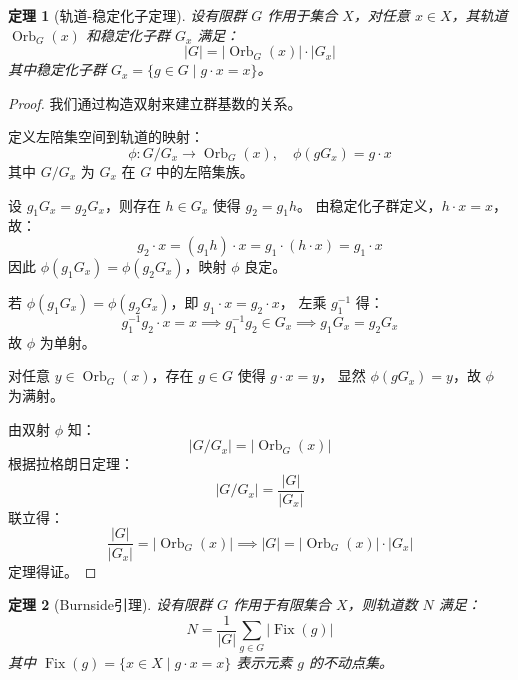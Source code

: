 \documentclass{ctexart}
\newtheorem{theorem}{定理} %
\newtheorem{proof}{证} %
\DeclareMathOperator{\Orb}{Orb} %
\DeclareMathOperator{\Fix}{Fix}
\begin{document}
    \begin{theorem}[轨道-稳定化子定理]
        设有限群 \( G \) 作用于集合 \( X \)，对任意 \( x \in X \)，其轨道 \( \Orb_G(x) \) 和稳定化子群 \( G_x \) 满足：
        \[
        |G| = |\Orb_G(x)| \cdot |G_x|
        \]
        其中稳定化子群 \( G_x = \{ g \in G \mid g \cdot x = x \} \)。
    \end{theorem}

    

\begin{proof}
我们通过构造双射来建立群基数的关系。


定义左陪集空间到轨道的映射：
\[
\phi: G / G_x \to \Orb_G(x), \quad \phi(gG_x) = g \cdot x
\]
其中 \( G / G_x \) 为 \( G_x \) 在 \( G \) 中的左陪集族。


设 \( g_1 G_x = g_2 G_x \)，则存在 \( h \in G_x \) 使得 \( g_2 = g_1 h \)。  
由稳定化子群定义，\( h \cdot x = x \)，故：
\[
g_2 \cdot x = (g_1 h) \cdot x = g_1 \cdot (h \cdot x) = g_1 \cdot x
\]
因此 \( \phi(g_1 G_x) = \phi(g_2 G_x) \)，映射 \( \phi \) 良定。


若 \( \phi(g_1 G_x) = \phi(g_2 G_x) \)，即 \( g_1 \cdot x = g_2 \cdot x \)，  
左乘 \( g_1^{-1} \) 得：
\[
g_1^{-1} g_2 \cdot x = x \implies g_1^{-1} g_2 \in G_x \implies g_1 G_x = g_2 G_x
\]
故 \( \phi \) 为单射。

对任意 \( y \in \Orb_G(x) \)，存在 \( g \in G \) 使得 \( g \cdot x = y \)，  
显然 \( \phi(g G_x) = y \)，故 \( \phi \) 为满射。

由双射 \( \phi \) 知：
\[
|G / G_x| = |\Orb_G(x)|
\]
根据拉格朗日定理：
\[
|G / G_x| = \frac{|G|}{|G_x|}
\]
联立得：
\[
\frac{|G|}{|G_x|} = |\Orb_G(x)| \implies |G| = |\Orb_G(x)| \cdot |G_x|
\]
定理得证。
\end{proof}

\begin{theorem}[Burnside引理]
    设有限群 \( G \) 作用于有限集合 \( X \)，则轨道数 \( N \) 满足：
    \[
    N = \frac{1}{|G|} \sum_{g \in G} |\Fix(g)|
    \]
    其中 \( \Fix(g) = \{ x \in X \mid g \cdot x = x \} \) 表示元素 \( g \) 的不动点集。
    \end{theorem}
\end{document}
